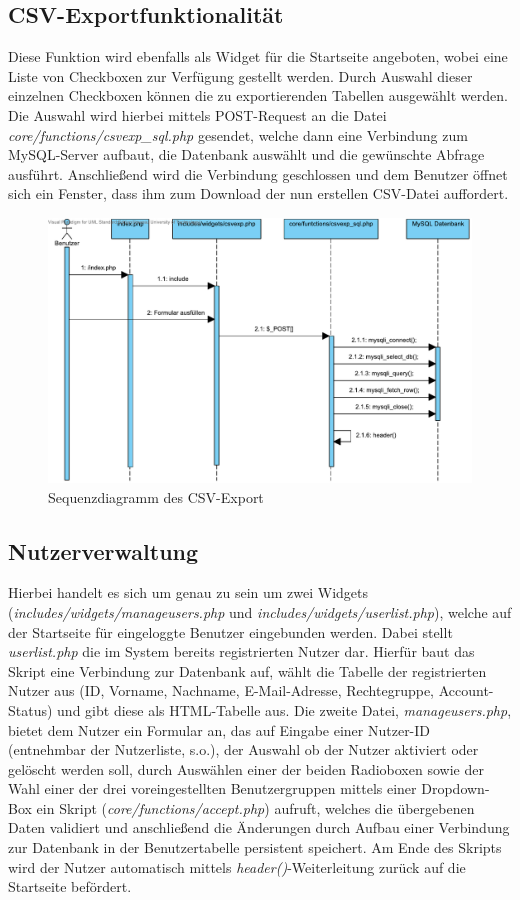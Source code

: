 \documentclass[fontsize = 12pt, paper = a4]{scrreprt}
\begin{document}
\newpage
\subsection{CSV-Exportfunktionalität}
Diese Funktion wird ebenfalls als Widget für die Startseite angeboten, wobei eine Liste von Checkboxen zur Verfügung gestellt werden. Durch Auswahl dieser einzelnen Checkboxen können die zu exportierenden Tabellen ausgewählt werden. Die Auswahl wird hierbei mittels POST-Request an die Datei \textit{core/functions/csvexp\_sql.php} gesendet, welche dann eine Verbindung zum MySQL-Server aufbaut, die Datenbank auswählt und die gewünschte Abfrage ausführt. Anschließend wird die Verbindung geschlossen und dem Benutzer öffnet sich ein Fenster, dass ihm zum Download der nun erstellen CSV-Datei auffordert.

\begin{figure}[h]
\centering
\includegraphics[scale = 0.6]{csvexport}
\caption[Sequenzdiagramm des CSV-Export]{Sequenzdiagramm des CSV-Export}
\label{csv}
\end{figure}

\newpage
\subsection{Nutzerverwaltung}
Hierbei handelt es sich um genau zu sein um zwei Widgets (\textit{includes/widgets/manageusers.php} und \textit{includes/widgets/userlist.php}), welche auf der Startseite für eingeloggte Benutzer eingebunden werden. Dabei stellt \textit{userlist.php} die im System bereits registrierten Nutzer dar. Hierfür baut das Skript eine Verbindung zur Datenbank auf, wählt die Tabelle der registrierten Nutzer aus (ID, Vorname, Nachname, E-Mail-Adresse, Rechtegruppe, Account-Status) und gibt diese als HTML-Tabelle aus. Die zweite Datei, \textit{manageusers.php}, bietet dem Nutzer ein Formular an, das auf Eingabe einer Nutzer-ID (entnehmbar der Nutzerliste, s.o.), der Auswahl ob der Nutzer aktiviert oder gelöscht werden soll, durch Auswählen einer der beiden Radioboxen sowie der Wahl einer der drei voreingestellten Benutzergruppen mittels einer Dropdown-Box ein Skript (\textit{core/functions/accept.php}) aufruft, welches die übergebenen Daten validiert und anschließend die Änderungen durch Aufbau einer Verbindung zur Datenbank in der Benutzertabelle persistent speichert. Am Ende des Skripts wird der Nutzer automatisch mittels \textit{header()}-Weiterleitung zurück auf die Startseite befördert.
\end{document}
